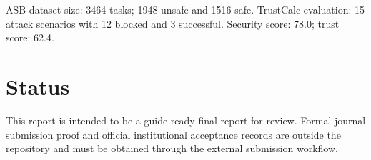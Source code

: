 \documentclass[11pt]{article}
\begin{document}
ASB dataset size: 3464 tasks; 1948 unsafe and 1516 safe.\newline
TrustCalc evaluation: 15 attack scenarios with 12 blocked and 3 successful.\newline
Security score: 78.0; trust score: 62.4.

\section{Status}
This report is intended to be a guide-ready final report for review. Formal journal submission proof and official institutional acceptance records are outside the repository and must be obtained through the external submission workflow.
\end{document}
